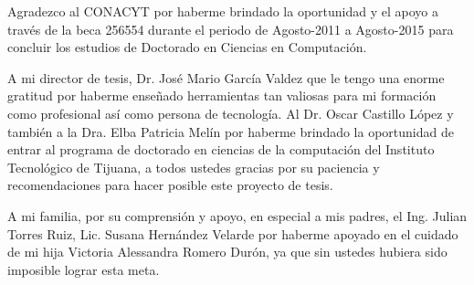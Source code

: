
 Agradezco al CONACYT por haberme brindado la
oportunidad y el apoyo a trav\'es de la beca 256554 durante el periodo de
Agosto-2011 a Agosto-2015 para concluir los estudios de Doctorado en Ciencias en
Computaci\'on.

A mi director de tesis, Dr. Jos\'e Mario Garc\'ia Valdez  que le tengo una
enorme gratitud por haberme ense\~nado herramientas tan valiosas para mi
formaci\'on como profesional as\'i como persona de tecnolog\'ia. Al Dr. Oscar
Castillo L\'opez y tambi\'en a la Dra. Elba Patricia Mel\'in por haberme
brindado la oportunidad de entrar al programa de doctorado en ciencias de la
computaci\'on del Instituto Tecnol\'ogico de Tijuana, a todos ustedes gracias
por su paciencia y recomendaciones para hacer posible este proyecto de tesis.


A mi familia, por su comprensi\'on y apoyo, en especial a mis padres, el Ing.
Julian Torres Ruiz, Lic. Susana Hern\'andez Velarde por haberme apoyado en el
cuidado de mi hija Victoria Alessandra Romero Dur\'on, ya que sin ustedes hubiera
sido imposible lograr esta meta.



\textit{}
